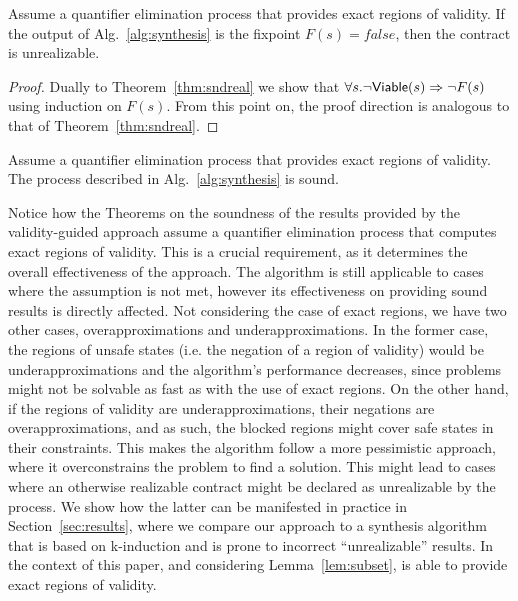 
\begin{theorem}
\label{thm:sndunreal}

Assume a quantifier elimination process that provides exact regions of validity. If the output of Alg.~\ref{alg:synthesis} is the fixpoint $F(s) = false$, then the contract is unrealizable.
\end{theorem}
\begin{proof}
Dually to Theorem~\ref{thm:sndreal} we show that $\forall s. \lnot {\mathsf {Viable}}(s) \Rightarrow \lnot F(s)$ using induction on $F(s)$. From this point on, the proof direction is analogous to that of Theorem~\ref{thm:sndreal}.
\end{proof}


\begin{corollary}
Assume a quantifier elimination process that provides exact regions of validity. The process described in Alg.~\ref{alg:synthesis} is sound.
\end{corollary}

Notice how the Theorems on the soundness of the results provided by the validity-guided approach assume a quantifier elimination process that computes exact regions of validity. This is a crucial requirement, as it determines the overall effectiveness of the approach. The algorithm is still applicable to cases where the assumption is not met, however its effectiveness on providing sound results is directly affected. Not considering the case of exact regions, we have two other cases, overapproximations and underapproximations. In the former case, the regions of unsafe states (i.e. the negation of a region of validity) would be underapproximations and the algorithm's performance decreases, since problems might not be solvable as fast as with the use of exact regions. On the other hand, if the regions of validity are underapproximations, their negations are overapproximations, and as such, the blocked regions might cover safe states in their constraints. This makes the algorithm follow a more pessimistic approach, where it overconstrains the problem to find a solution. This might lead to cases where an otherwise realizable contract might be declared as unrealizable by the process. We show how the latter can be manifested in practice in Section~\ref{sec:results}, where we compare our approach to a synthesis algorithm that is based on k-induction and is prone to incorrect ``unrealizable'' results. In the context of this paper, and considering Lemma~\ref{lem:subset}, \aeval is able to provide exact regions of validity.
\fi


